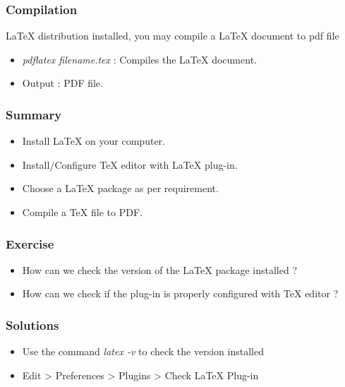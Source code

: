 \documentclass[17pt,compress]{beamer}
\begin{document}
\begin{frame}[fragile]
  \frametitle{Compilation}
  LaTeX distribution installed, you may compile a LaTeX document to pdf file
  \begin{itemize}
  \item \emph{pdflatex filename.tex} : Compiles the LaTeX document.
  \item Output : PDF file.
  \end{itemize} 
\end{frame}


\begin{frame}[fragile]
	\frametitle{Summary}
	\begin{itemize}
        \item Install LaTeX on your computer.
        \item Install/Configure TeX editor with LaTeX plug-in.
        \item Choose a LaTeX package as per requirement.
	\item Compile a TeX file to PDF.
	\end{itemize}
\end{frame}

\begin{frame}[fragile]
	\frametitle{Exercise}
	\begin{itemize}
        \item How can we check the version of the LaTeX package installed ?
        \item How can we check if the plug-in is properly configured with TeX 
              editor ?
	\end{itemize}
\end{frame}

\begin{frame}[fragile]
	\frametitle{Solutions}
	\begin{itemize}
        \item Use the command \textit {latex -v} to check the version installed
        \item Edit > Preferences > Plugins > Check LaTeX Plug-in
	\end{itemize}
\end{frame}
\end{document}
